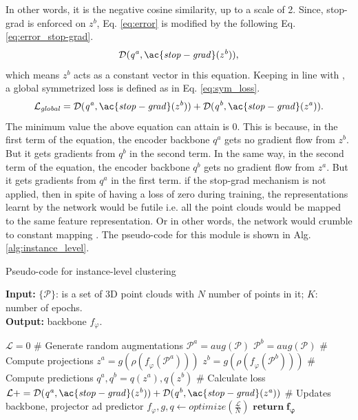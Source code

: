In other words, it is the negative cosine similarity, up to a scale of 2. Since, \ac{stop-grad} is enforced on $z^b$, Eq. \ref{eq:error} is modified by the following Eq. \ref{eq:error_stop-grad}.
\begin{equation}
    \label{eq:error_stop-grad}
    \mathcal{D}(\mathit{q^a, \ac{stop-grad}(z^b)}), 
\end{equation}
which means $z^b$ acts as a constant vector in this equation. Keeping in line with \cite{chen2021exploring}, a global symmetrized loss is defined as in Eq. \ref{eq:sym_loss}.
\begin{equation}
    \label{eq:sym_loss}
    \mathcal{L}_{\mathit{global}} = \mathcal{D}(\mathit{q^a, \ac{stop-grad}(z^b)})  + \mathcal{D}(\mathit{q^b, \ac{stop-grad}(z^a)}). 
\end{equation}
The minimum value the above equation can attain is 0. This is because, in the first term of the equation, the encoder backbone $q^a$ gets no gradient flow from $z^b$. But it gets gradients from $q^b$ in the second term. In the same way, in the second term of the equation, the encoder backbone $q^b$ gets no gradient flow from $z^a$. But it gets gradients from $q^a$ in the first term. if the \ac{stop-grad} mechanism is not applied, then in spite of having a loss of zero during training, the representations learnt by the network would be futile i.e. all the point clouds would be mapped to the same feature representation. Or in other words, the network would crumble to  constant mapping \cite{chen2021exploring}. The pseudo-code for this module is shown in Alg. \ref{alg:instance_level}.

\begin{algorithm}[H]
    \caption{Pseudo-code for instance-level clustering}\label{alg:instance_level}
    \textbf{Input:} $\{\mathcal{P}\}$: is a set of 3D point clouds with $\mathit{N}$ number of points in it; $\mathit{K}$: number of epochs. \\
    \textbf{Output:} backbone $f_{\varphi}$.
    \begin{algorithmic}[1]
            \State $\mathcal{L} = 0$
                \State \# Generate random augmentations
                \State $ \mathcal{P}^a = aug(\mathcal{P})$
                \State $ \mathcal{P}^b = aug(\mathcal{P})$
                \State \# Compute projections
                \State $\mathit{z^a = g(\rho(f_{\varphi}(\mathcal{P}^a)))}$
                \State $\mathit{z^b = g(\rho(f_{\varphi}(\mathcal{P}^b)))}$
                \State \# Compute predictions
                \State $\mathit{q^a, q^b = q(z^a), q(z^b)}$
                \State \# Calculate loss
                \State $\mathcal{L} += \mathcal{D}(\mathit{q^a, \ac{stop-grad}(z^b)})  + \mathcal{D}(\mathit{q^b, \ac{stop-grad}(z^a)})$
            \EndFor
            \State \# Updates backbone, projector ad predictor
            \State $ f_{\varphi}, g, q \gets optimize(\frac{\mathcal{L}}{N})$
        \EndFor
        \State $\mathbf{return \; f_{\varphi}}$          
    \end{algorithmic}
\end{algorithm}

